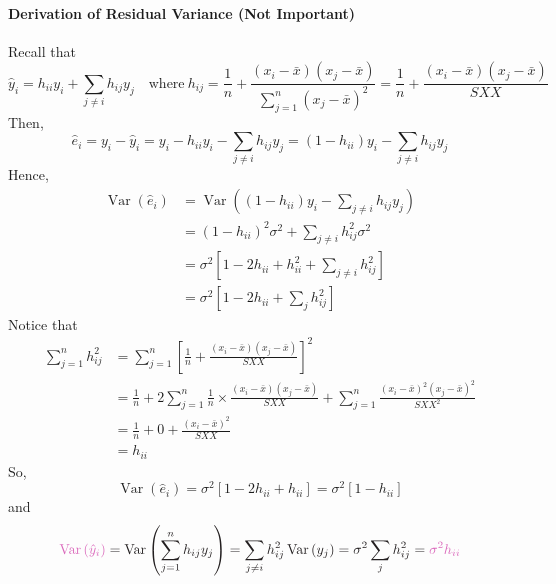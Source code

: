 \documentclass[11pt]{article}
\begin{document}
\paragraph{Derivation of Residual Variance (Not Important)}
Recall that
\begin{equation*}
    \hat{y}_{i}=h_{i i} y_{i}+\sum_{j \neq i} h_{i j} y_{j} \quad \text{where}~h_{i j}=\frac{1}{n}+\frac{\left(x_{i}-\bar{x}\right)\left(x_{j}-\bar{x}\right)}{\sum_{j=1}^{n}\left(x_{j}-\bar{x}\right)^{2}}=\frac{1}{n}+\frac{\left(x_{i}-\bar{x}\right)\left(x_{j}-\bar{x}\right)}{S X X}
\end{equation*}
Then,
\begin{equation*}
    \hat{e}_{i}=y_{i}-\hat{y}_{i}=y_{i}-h_{i i} y_{i}-\sum_{j \neq i} h_{i j} y_{j}=\left(1-h_{i i}\right) y_{i}-\sum_{j \neq i} h_{i j} y_{j}
\end{equation*}
Hence,
\begin{align*}
    \operatorname{Var}\left(\hat{e}_{i}\right) &= \operatorname{Var}\left(\left(1-h_{i i}\right) y_{i}-\sum_{j \neq i} h_{i j} y_{j}\right) \\
    &= \left(1-h_{i i}\right)^{2} \sigma^{2}+\sum_{j \neq i} h_{i j}^{2} \sigma^{2} \\
    &= \sigma^{2}\left[1-2 h_{i i}+h_{i i}^{2}+\sum_{j \neq i} h_{i j}^{2}\right] \\
    &=\sigma^{2}\left[1-2 h_{i i}+\sum_{j} h_{i j}^{2}\right]
\end{align*}
Notice that 
\begin{align*} 
    \sum_{j=1}^{n} h_{i j}^{2} &=\sum_{j=1}^{n}\left[\frac{1}{n}+\frac{\left(x_{i}-\bar{x}\right)\left(x_{j}-\bar{x}\right)}{S X X}\right]^{2} \\ &=\frac{1}{n}+2 \sum_{j=1}^{n} \frac{1}{n} \times \frac{\left(x_{i}-\bar{x}\right)\left(x_{j}-\bar{x}\right)}{S X X}+\sum_{j=1}^{n} \frac{\left(x_{i}-\bar{x}\right)^{2}\left(x_{j}-\bar{x}\right)^{2}}{S X X^{2}} \\ &=\frac{1}{n}+0+\frac{\left(x_{i}-\bar{x}\right)^{2}}{S X X} \\ &=h_{i i} 
\end{align*}
So,
\begin{equation*}
    \operatorname{Var}\left(\hat{e}_{i}\right)=\sigma^{2}\left[1-2 h_{i i}+h_{i i}\right]=\sigma^{2}\left[1-h_{i i}\right]
\end{equation*}
and
\begin{equation*}
    \color{Thistle}{\operatorname{Var}\left(\hat{y}_{i}\right)} \color{Black}=\operatorname{Var}\left(\sum_{j=1}^{n} h_{i j} y_{j}\right)=\sum_{j \neq i} h_{i j}^{2} \operatorname{Var}\left(y_{j}\right)=\sigma^{2} \sum_{j} h_{i j}^{2}=\color{Thistle}{\sigma^{2} h_{i i}}
\end{equation*}
\end{document}
